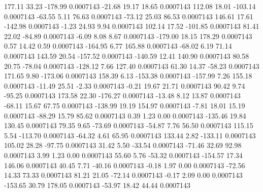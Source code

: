       177.11       33.23     -178.99     0.0007143
      -21.68       19.17       18.65     0.0007143
      112.08       18.01     -103.14     0.0007143
      -63.55        5.11       76.63     0.0007143
      -73.12       25.03       86.53     0.0007143
      146.61       17.61     -142.98     0.0007143
       -1.23       24.93        9.94     0.0007143
      102.14       17.52     -101.85     0.0007143
       81.41       22.02      -84.89     0.0007143
       -6.09        8.08        8.67     0.0007143
     -179.00       18.15      178.29     0.0007143
        0.57       14.42        0.59     0.0007143
     -164.95        6.77      165.88     0.0007143
      -68.02        6.19       71.14     0.0007143
      143.59       20.54     -157.52     0.0007143
     -140.59       12.41      140.90     0.0007143
       80.58       20.75      -78.04     0.0007143
     -128.12        7.66      127.40     0.0007143
       61.30       14.37      -58.23     0.0007143
      171.65        9.80     -173.06     0.0007143
      158.39        6.13     -153.38     0.0007143
     -157.99        7.26      155.18     0.0007143
      -11.49       25.51       -2.33     0.0007143
       -0.21       19.67       21.71     0.0007143
       90.42        9.74      -95.25     0.0007143
      173.58       22.30     -176.27     0.0007143
      -13.48        8.12       13.87     0.0007143
      -68.11       15.67       67.75     0.0007143
     -138.99       19.19      154.97     0.0007143
       -7.81       18.01       15.19     0.0007143
      -88.29       15.79       85.62     0.0007143
        0.39        1.23        0.00     0.0007143
     -135.46       19.84      130.45     0.0007143
       79.35        9.65      -73.69     0.0007143
      -54.87        7.76       56.50     0.0007143
      115.15        5.54     -113.70     0.0007143
      -64.32        4.61       65.95     0.0007143
      133.44        2.82     -133.11     0.0007143
      105.02       28.28      -97.75     0.0007143
       31.42        5.50      -33.54     0.0007143
      -71.46       32.69       92.98     0.0007143
        3.99        1.23        0.00     0.0007143
       55.60        5.76      -53.32     0.0007143
     -154.57       17.34      146.06     0.0007143
       40.45        7.71      -40.16     0.0007143
       -0.18        1.97        0.00     0.0007143
      -72.56       14.33       73.33     0.0007143
       81.21       21.05      -72.14     0.0007143
       -0.17        2.09        0.00     0.0007143
     -153.65       30.79      178.05     0.0007143
      -53.97       18.42       44.44     0.0007143
